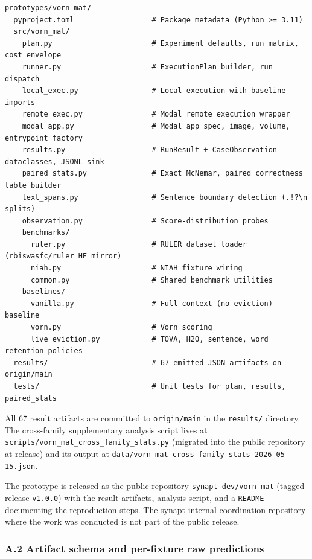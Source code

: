 \documentclass[
]{article}
\begin{document}
\begin{verbatim}
prototypes/vorn-mat/
  pyproject.toml                  # Package metadata (Python >= 3.11)
  src/vorn_mat/
    plan.py                       # Experiment defaults, run matrix, cost envelope
    runner.py                     # ExecutionPlan builder, run dispatch
    local_exec.py                 # Local execution with baseline imports
    remote_exec.py                # Modal remote execution wrapper
    modal_app.py                  # Modal app spec, image, volume, entrypoint factory
    results.py                    # RunResult + CaseObservation dataclasses, JSONL sink
    paired_stats.py               # Exact McNemar, paired correctness table builder
    text_spans.py                 # Sentence boundary detection (.!?\n splits)
    observation.py                # Score-distribution probes
    benchmarks/
      ruler.py                    # RULER dataset loader (rbiswasfc/ruler HF mirror)
      niah.py                     # NIAH fixture wiring
      common.py                   # Shared benchmark utilities
    baselines/
      vanilla.py                  # Full-context (no eviction) baseline
      vorn.py                     # Vorn scoring
      live_eviction.py            # TOVA, H2O, sentence, word retention policies
  results/                        # 67 emitted JSON artifacts on origin/main
  tests/                          # Unit tests for plan, results, paired_stats
\end{verbatim}

All 67 result artifacts are committed to \texttt{origin/main} in the
\texttt{results/} directory. The cross-family supplementary analysis
script lives at \texttt{scripts/\allowbreak{}vorn\_mat\_cross\_family\_stats.\allowbreak{}py}
(migrated into the public repository at release) and its output at
\texttt{data/\allowbreak{}vorn-mat-cross-family-stats-2026-05-15.\allowbreak{}json}.

The prototype is released as the public repository
\texttt{synapt-dev/vorn-mat} (tagged release \texttt{v1.0.0}) with the
result artifacts, analysis script, and a \texttt{README} documenting the
reproduction steps. The synapt-internal coordination repository where
the work was conducted is not part of the public release.

\subsubsection{A.2 Artifact schema and per-fixture raw
predictions}\label{a2-artifact-schema-and-per-fixture-raw-predictions}
\end{document}
